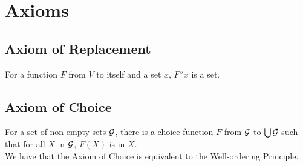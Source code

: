 \section{Axioms}

\subsection{Axiom of Replacement}

For a function $F$ from $V$ to itself and a set $x$, $F''x$ is a set.

\subsection{Axiom of Choice}

For a set of non-empty sets $\mathcal{G}$, there is a choice function
$F$ from $\mathcal{G}$ to $\bigcup \mathcal{G}$ such that for all $X$ in $\mathcal{G}$,
$F(X)$ is in $X$.
\\[\baselineskip]
We have that the Axiom of Choice is equivalent to the Well-ordering
Principle.

